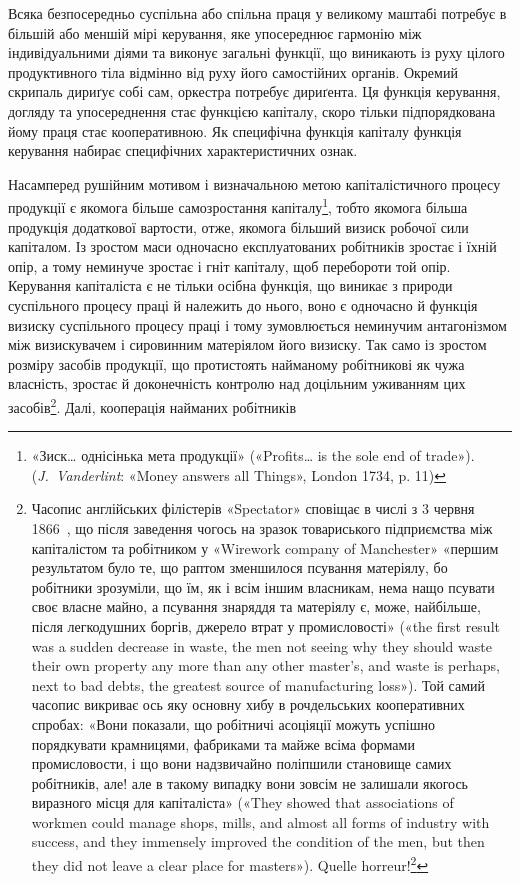Всяка безпосередньо суспільна або спільна праця у великому
маштабі потребує в більшій або меншій мірі керування, яке упосереднює
гармонію між індивідуальними діями та виконує загальні
функції, що виникають із руху цілого продуктивного тіла
відмінно від руху його самостійних органів. Окремий скрипаль
дириґує собі сам, оркестра потребує дириґента. Ця функція
керування, догляду та упосереднення стає функцією капіталу,
скоро тільки підпорядкована йому праця стає кооперативною.
Як специфічна функція капіталу функція керування набирає
специфічних характеристичних ознак.

Насамперед рушійним мотивом і визначальною метою капіталістичного
процесу продукції є якомога більше самозростання
капіталу\footnote{
«Зиск\dots{} однісінька мета продукції» («Profits\dots{} is the sole end
of trade»). (\emph{J.~Vanderlint}: «Money answers all Things», London 1734,
p. 11)
}, тобто якомога більша продукція додаткової вартости,
отже, якомога більший визиск робочої сили капіталом. Із зростом
маси одночасно експлуатованих робітників зростає і їхній
опір, а тому неминуче зростає і гніт капіталу, щоб перебороти
той опір. Керування капіталіста є не тільки осібна функція, що
виникає з природи суспільного процесу праці й належить до нього,
воно є одночасно й функція визиску суспільного процесу праці
і тому зумовлюється неминучим антагонізмом між визискувачем
і сировинним матеріялом його визиску. Так само із зростом розміру
засобів продукції, що протистоять найманому робітникові
як чужа власність, зростає й доконечність контролю над доцільним
уживанням цих засобів\footnote{
Часопис англійських філістерів «Spectator» сповіщає в числі
з 3 червня 1866~, що після заведення чогось на зразок товариського підприємства
між капіталістом та робітником у «Wirework company of Manchester»
«першим результатом було те, що раптом зменшилося псування
матеріялу, бо робітники зрозуміли, що їм, як і всім іншим власникам,
нема нащо псувати своє власне майно, а псування знаряддя та матеріялу
є, може, найбільше, після легкодушних боргів, джерело втрат у промисловості»
(«the first result was a sudden decrease in waste, the men not seeing
why they should waste their own property any more than any other master’s,
and waste is perhaps, next to bad debts, the greatest source of manufacturing
loss»). Той самий часопис викриває ось яку основну хибу в рочдельських кооперативних
спробах: «Вони показали, що робітничі асоціяції можуть
успішно порядкувати крамницями, фабриками та майже всіма формами
промисловости, і що вони надзвичайно поліпшили становище самих робітників,
але! але в такому випадку вони зовсім не залишали якогось виразного
місця для капіталіста» («They showed that associations of workmen
could manage shops, mills, and almost all forms of industry with success,
and they immensely improved the condition of the men, but then they did
not leave a clear place for masters»). Quelle horreur!\footnote*{
Який жах! \emph{Ред.}
}
}. Далі, кооперація найманих робітників
